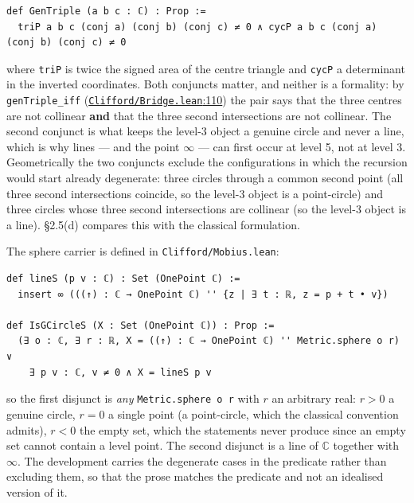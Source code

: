 \documentclass[11pt]{article}
\theoremstyle{definition}
\theoremstyle{remark}
\begin{document}
\begin{Verbatim}
def GenTriple (a b c : ℂ) : Prop :=
  triP a b c (conj a) (conj b) (conj c) ≠ 0 ∧ cycP a b c (conj a) (conj b) (conj c) ≠ 0
\end{Verbatim}

where \texttt{triP} is twice the signed area of the centre triangle and \texttt{cycP} a determinant in the inverted
coordinates. Both conjuncts matter, and neither is a formality: by \texttt{genTriple\_\allowbreak iff}
(\href{https://github.com/jpbald93/paperl_clifford_chain/blob/e1ae145c2565cc98816635387412edc0a740c27c/Clifford/Bridge.lean\#L110}{\texttt{Clifford/\allowbreak Bridge.lean}:110}) the pair says that the three centres are not collinear \textbf{and} that the
three second intersections are not collinear. The second conjunct is what keeps the level-3 object a
genuine circle and never a line, which is why lines --- and the point $\infty$ --- can first occur at level 5, not
at level 3. Geometrically the two conjuncts exclude the configurations in which the recursion would start
already degenerate: three circles through a common second point (all three second intersections coincide,
so the level-3 object is a point-circle) and three circles whose three second intersections are collinear
(so the level-3 object is a line). \S{}2.5(d) compares this with the classical formulation.

The sphere carrier is defined in \texttt{Clifford/\allowbreak Mobius.\allowbreak lean}:

\begin{Verbatim}
def lineS (p v : ℂ) : Set (OnePoint ℂ) :=
  insert ∞ (((↑) : ℂ → OnePoint ℂ) '' {z | ∃ t : ℝ, z = p + t • v})

def IsGCircleS (X : Set (OnePoint ℂ)) : Prop :=
  (∃ o : ℂ, ∃ r : ℝ, X = ((↑) : ℂ → OnePoint ℂ) '' Metric.sphere o r) ∨
    ∃ p v : ℂ, v ≠ 0 ∧ X = lineS p v
\end{Verbatim}

so the first disjunct is \emph{any} \texttt{Metric.\allowbreak sphere\ o\ r} with \(r\) an arbitrary real: \(r > 0\) a genuine circle,
\(r = 0\) a single point (a point-circle, which the classical convention admits), \(r < 0\) the empty set,
which the statements never produce since an empty set cannot contain a level point. The second disjunct
is a line of \(\mathbb{C}\) together with $\infty$. The development carries the degenerate cases in the predicate
rather than excluding them, so that the prose matches the predicate and not an idealised version of it.
\end{document}
